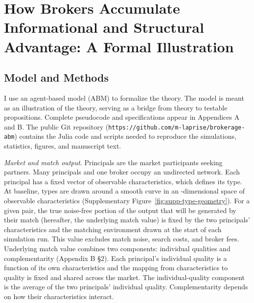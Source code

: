 
\section{How Brokers Accumulate Informational and Structural Advantage: A Formal Illustration}

\subsection{Model and Methods}

I use an agent-based model (ABM) to formalize the theory. The model is meant as an illustration of the theory, serving as a bridge from theory to testable propositions. Complete pseudocode and specifications appear in Appendices A and B. The public Git repository (\texttt{https://github.com/m-laprise/brokerage-abm}) contains the Julia code and scripts needed to reproduce the simulations, statistics, figures, and manuscript text.

\emph{Market and match output}. Principals are the market participants seeking partners. Many principals and one broker occupy an undirected network. Each principal has a fixed vector of observable characteristics, which defines its type. At baseline, types are drawn around a smooth curve in an -dimensional space of observable characteristics (Supplementary Figure~\ref{fig:supp-type-geometry}). For a given pair, the true noise-free portion of the output that will be generated by their match (hereafter, the underlying match value) is fixed by the two principals' characteristics and the matching environment drawn at the start of each simulation run. This value excludes match noise, search costs, and broker fees. Underlying match value combines two components: individual qualities and complementarity (Appendix B \S2). Each principal's individual quality is a function of its own characteristics and the mapping from characteristics to quality is fixed and shared across the market. The individual-quality component is the average of the two principals' individual quality. Complementarity depends on how their characteristics interact.

